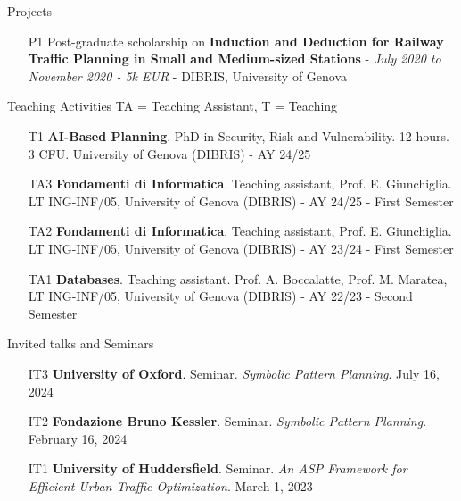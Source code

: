 \documentclass{resume} %
\begin{document}
\begin{rSection}{Projects}

\begin{enumerate}[leftmargin=5mm]
\item[P1] Post-graduate scholarship on \textbf{Induction and Deduction for Railway Traffic Planning in Small and Medium-sized Stations} - \textit{July 2020 to November 2020 - 5k EUR} - DIBRIS, University of Genova
\end{enumerate}
\end{rSection}

\begin{rSection}{Teaching Activities {\tiny TA = Teaching Assistant, T = Teaching}}
\begin{enumerate}[leftmargin=5mm]
\item[T1] \textbf{AI-Based Planning}. PhD in Security, Risk and Vulnerability. 12 hours. 3 CFU.  University of Genova (DIBRIS) - AY 24/25
\item[TA3] \textbf{Fondamenti di Informatica}. Teaching assistant, Prof. E. Giunchiglia. LT ING-INF/05, University of Genova (DIBRIS) - AY 24/25 - First Semester
\item[TA2] \textbf{Fondamenti di Informatica}. Teaching assistant, Prof. E. Giunchiglia. LT ING-INF/05, University of Genova (DIBRIS) - AY 23/24 - First Semester
\item[TA1] \textbf{Databases}. Teaching assistant. Prof. A. Boccalatte, Prof. M. Maratea, LT ING-INF/05, University of Genova (DIBRIS) - AY 22/23 - Second Semester
\end{enumerate}
\end{rSection}

\begin{rSection}{Invited talks and Seminars}
\begin{enumerate}[leftmargin=5mm]
	\item[IT3] \textbf{University of Oxford}. Seminar. \textit{Symbolic Pattern Planning}. July 16, 2024
	\item[IT2] \textbf{Fondazione Bruno Kessler}. Seminar. \textit{Symbolic Pattern Planning}. February 16, 2024
	\item[IT1] \textbf{University of Huddersfield}. Seminar. \textit{An ASP Framework for Efficient Urban Traffic Optimization}. March 1, 2023
\end{enumerate}


\end{rSection}
\end{document}
